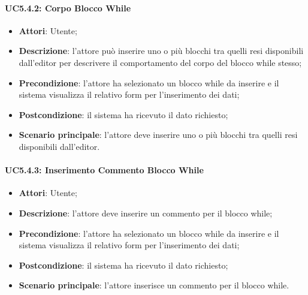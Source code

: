 \paragraph{UC5.4.2: Corpo Blocco While}
\label{UC5.4.2}
\begin{itemize}
	\item \textbf{Attori}: Utente;
	\item \textbf{Descrizione}: l'attore può inserire uno o più blocchi tra quelli resi disponibili dall'editor per descrivere il comportamento del corpo del blocco while stesso;
	\item \textbf{Precondizione}: l'attore ha selezionato un blocco while da inserire e il sistema visualizza il relativo form per l'inserimento dei dati;
	\item \textbf{Postcondizione}: il sistema ha ricevuto il dato richiesto;
	\item \textbf{Scenario principale}: l'attore deve inserire uno o più blocchi tra quelli resi disponibili dall'editor.
\end{itemize}

\paragraph{UC5.4.3: Inserimento Commento Blocco While}
\label{UC5.4.3}
\begin{itemize}
	\item \textbf{Attori}: Utente;
	\item \textbf{Descrizione}: l'attore deve inserire un commento per il blocco while;
	\item \textbf{Precondizione}: l'attore ha selezionato un blocco while da inserire e il sistema visualizza il relativo form per l'inserimento dei dati;
	\item \textbf{Postcondizione}: il sistema ha ricevuto il dato richiesto;
	\item \textbf{Scenario principale}: l'attore inserisce un commento per il blocco while.
\end{itemize}


